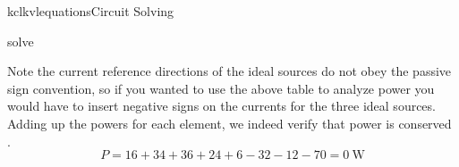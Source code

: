 \begin{mainquestion}{kclkvlequations}{Circuit Solving}
\begin{partquestion}{solve}
\begin{answer}
\begin{table}[htbp]
\end{table}

Note the current reference directions of the ideal sources do not obey the passive sign convention, so if you wanted to use the above table to analyze power you would have to insert negative signs on the currents for the three ideal sources. Adding up the powers for each element, we indeed verify that power is conserved
.
\[
P = 16 + 34 + 36 + 24 + 6 -32 - 12 - 70 = \qty{0}{\watt}
\]

\end{answer}
\end{partquestion}

\end{mainquestion}